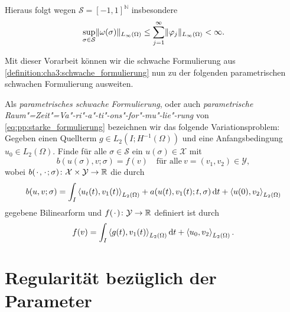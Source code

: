 Hieraus folgt wegen $\mathcal S = [-1, 1]^{\mathbb{N}}$ insbesondere
\begin{equation}
    \sup_{\sigma \in \mathcal S} \lVert\omega(\sigma)\rVert_{L_{\infty}(\Omega)} \leq \sum_{j = 1}^{\infty} \lVert\varphi_{j}\rVert_{L_{\infty}(\Omega)} < \infty.
\end{equation}

Mit dieser Vorarbeit können wir die schwache Formulierung aus \cref{definition:cha3:schwache_formulierung} nun zu der folgenden parametrischen schwachen Formulierung ausweiten.


\begin{Definition}
\label{definition:cha3:param_schwache_formulierung}
    Als \emph{parametrisches schwache Formulierung}, oder auch \emph{parametrische Raum"=Zeit"=Va"-ri"-a"-ti"-ons"-for"-mu"-lie"-rung} von \cref{eq:pp:starke_formulierung} bezeichnen wir das folgende Variationsproblem:
    Gegeben einen Quellterm $g \in L_{2}(I; H^{-1}(\Omega))$ und eine Anfangsbedingung $u_{0} \in L_{2}(\Omega)$.
    Finde für alle $\sigma \in \mathcal S$ ein $u(\sigma) \in \mathcal X$ mit
    \begin{equation}
        \label{eq:varprob}
        b(u(\sigma), v; \sigma) = f(v) \quad \text{für alle}~v = (v_{1}, v_{2}) \in \mathcal Y,
    \end{equation}
    wobei $b({\mkern2mu\cdot\mkern2mu}, {\mkern2mu\cdot\mkern2mu}; \sigma) \colon \mathcal X \times \mathcal Y \to \mathbb{R}$ die durch
    \begin{equation}
        \label{eq:buv_param}
        b(u, v; \sigma)
            = \int_{I} \left\langle u_{t}(t),v_{1}(t)\right\rangle_{L_{2}(\Omega)} + a(u(t), v_{1}(t); t, \sigma) \mathop{}\!\mathrm{d} t + \left\langle u(0),v_{2}\right\rangle_{L_{2}(\Omega)}
    \end{equation}
    gegebene Bilinearform und $f({\mkern2mu\cdot\mkern2mu}) \colon \mathcal Y \to \mathbb{R}$ definiert ist durch
    \begin{equation}
        \label{eq:var_all_f_wiederholung}
        f(v) = \int_{I} \left\langle g(t),v_{1}(t)\right\rangle_{L_{2}(\Omega)} \mathop{}\!\mathrm{d} t + \left\langle u_{0},v_{2}\right\rangle_{L_{2}(\Omega)}.
    \end{equation}
\end{Definition}



\section{Regularität bezüglich der Parameter} %
\label{sec:regularit_t_bez_glich_der_parameter}

